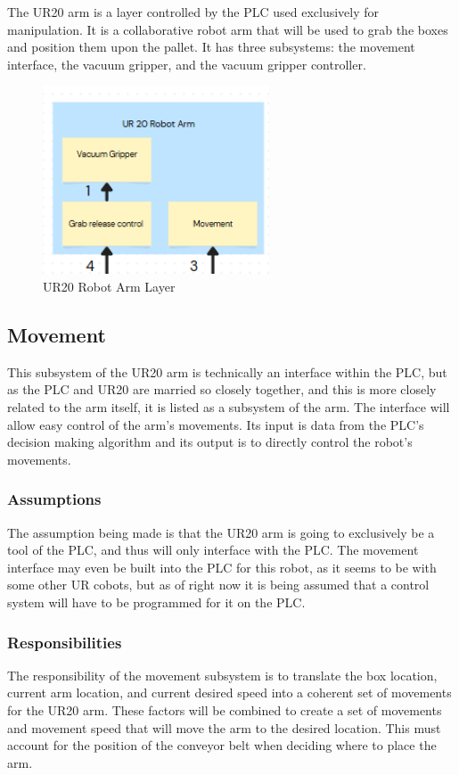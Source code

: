 The UR20 arm is a layer controlled by the PLC used exclusively for manipulation. It is a collaborative robot arm that will be used to grab the boxes and position them upon the pallet. It has three subsystems: the movement interface, the vacuum gripper, and the vacuum gripper controller.

\begin{figure}[h!]
	\centering
 	\includegraphics[width=0.60\textwidth]{images/UR20_ARM}
 \caption{UR20 Robot Arm Layer}
\end{figure}

\subsection{Movement}
This subsystem of the UR20 arm is technically an interface within the PLC, but as the PLC and UR20 are married so closely together, and this is more closely related to the arm itself, it is listed as a subsystem of the arm. The interface will allow easy control of the arm's movements. Its input is data from the PLC's decision making algorithm and its output is to directly control the robot's movements.

\subsubsection{Assumptions}
The assumption being made is that the UR20 arm is going to exclusively be a tool of the PLC, and thus will only interface with the PLC. The movement interface may even be built into the PLC for this robot, as it seems to be with some other UR cobots, but as of right now it is being assumed that a control system will have to be programmed for it on the PLC.

\subsubsection{Responsibilities}
The responsibility of the movement subsystem is to translate the box location, current arm location, and current desired speed into a coherent set of movements for the UR20 arm. These factors will be combined to create a set of movements and movement speed that will move the arm to the desired location. This must account for the position of the conveyor belt when deciding where to place the arm.

